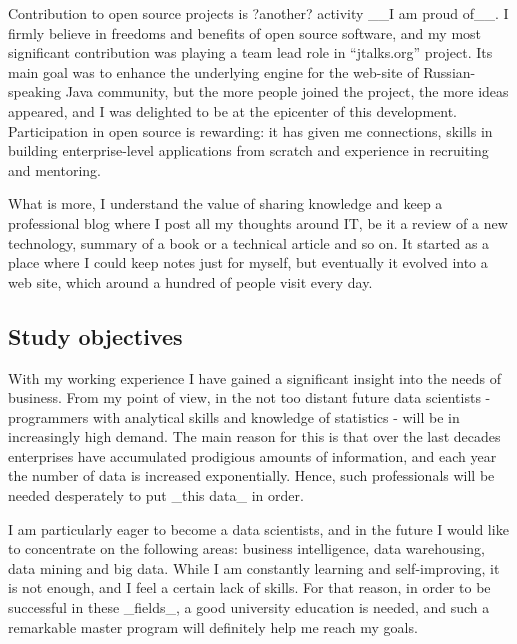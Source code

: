 \documentclass[a4paper,14pt]{extarticle}
\begin{document}
Contribution to open source projects is ?another? activity __I am proud of__. I firmly believe in freedoms and benefits of open source software, and my most significant contribution was playing a team lead role in ``jtalks.org'' project. Its main goal was to enhance the underlying engine for the web-site of Russian-speaking Java community, but the more people joined the project, the more ideas appeared, and I was delighted to be at the epicenter of this development. Participation in open source is rewarding: it has given me connections, skills in building enterprise-level applications from scratch and experience in recruiting and mentoring.

What is more, I understand the value of sharing knowledge and keep a professional blog where I post all my thoughts around IT, be it a review of a new technology, summary of a book or a technical article and so on. It started as a place where I could keep notes just for myself, but eventually it evolved into a web site, which around a hundred of people visit every day.


\subsection*{Study objectives}

With my working experience I have gained a significant insight into the needs of business. From my point of view, in the not too distant future data scientists - programmers with analytical skills and knowledge of statistics - will be in increasingly high demand. The main reason for this is that over the last decades enterprises have accumulated prodigious amounts of information, and each year the number of data is increased exponentially. Hence, such professionals will be needed desperately to put _this data_ in order.

I am particularly eager to become a data scientists, and in the future I would like to concentrate on the following areas: business intelligence, data warehousing, data mining and big data. While I am constantly learning and self-improving, it is not enough, and I feel a certain lack of skills. For that reason, in order to be successful in these _fields_, a good university education is needed, and such a remarkable master program will definitely help me reach my goals.
\end{document}

